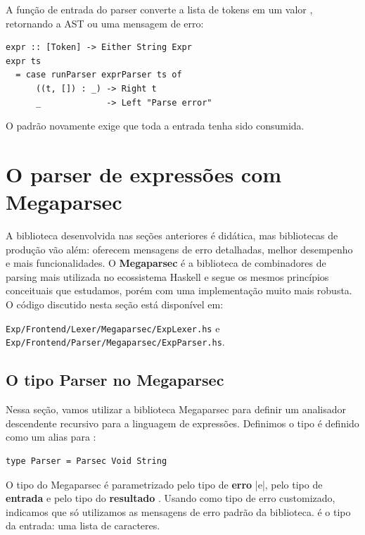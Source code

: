 A função de entrada do parser converte a lista de tokens em um valor
, retornando a AST ou uma mensagem de erro:

\begin{verbatim}
expr :: [Token] -> Either String Expr
expr ts
  = case runParser exprParser ts of
      ((t, []) : _) -> Right t
      _             -> Left "Parse error"
\end{verbatim}

O padrão  novamente exige que toda a
entrada tenha sido consumida.

\section{O parser de expressões com Megaparsec}

A biblioteca desenvolvida nas seções anteriores é didática, mas
bibliotecas de produção vão além: oferecem mensagens de erro
detalhadas, melhor desempenho e mais funcionalidades. O
\textbf{Megaparsec} é a biblioteca de combinadores de parsing mais
utilizada no ecossistema Haskell e segue os mesmos princípios
conceituais que estudamos, porém com uma implementação muito mais
robusta. O código discutido nesta seção está disponível em:
\begin{flushleft}
  \verb|Exp/Frontend/Lexer/Megaparsec/ExpLexer.hs| e\\
  \verb|Exp/Frontend/Parser/Megaparsec/ExpParser.hs|.
\end{flushleft}

\subsection{O tipo Parser no Megaparsec}

Nessa seção, vamos utilizar a biblioteca Megaparsec para definir um analisador
descendente recursivo para a linguagem de expressões.
Definimos o tipo  é definido como um alias para
:

\begin{verbatim}
type Parser = Parsec Void String
\end{verbatim}

O tipo  do Megaparsec é
parametrizado pelo tipo de \textbf{erro} \haskell|e|,
pelo tipo de \textbf{entrada}  e pelo tipo
do \textbf{resultado} . Usando
 como tipo de erro customizado,
indicamos que só utilizamos as mensagens de erro padrão da
biblioteca.  é o tipo da entrada:
uma lista de caracteres.

